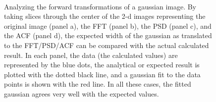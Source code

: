 \documentclass[11pt,preprint]{aastex}
\begin{document}
\begin{figure}[htbp]
\centering
{}
 \\
\caption{{\small
Analyzing the forward transformations of a gaussian image. By taking slices through the center of the 2-d images representing the original image (panel a), the FFT (panel b), the PSD (panel c), and the ACF (panel d), the expected width of the gaussian as translated to the FFT/PSD/ACF can be compared with the actual calculated result. In each panel, the data (the calculated values) are represented by the blue dots, the analytical or expected result is plotted with the dotted black line, and a gaussian fit to the data points is shown with the red line. In all these cases, the fitted gaussian agrees very well with the expected values.}}
\label{fig:gauss_slices}
\end{figure}
\end{document}
